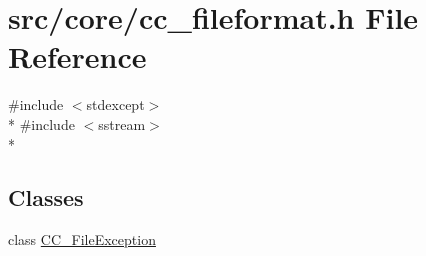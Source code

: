 \hypertarget{a00206}{\section{src/core/cc\-\_\-fileformat.h File Reference}
\label{a00206}
}
{\ttfamily \#include $<$stdexcept$>$}\\*
{\ttfamily \#include $<$sstream$>$}\\*
\subsection*{Classes}
\begin{DoxyCompactItemize}
\item 
class \hyperlink{a00032}{C\-C\-\_\-\-File\-Exception}
\end{DoxyCompactItemize}
